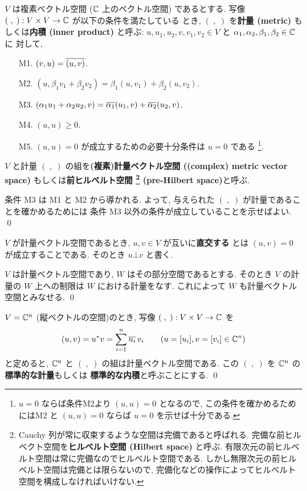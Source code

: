 \documentclass[12pt,twoside]{jarticle}
\begin{document}
$V$ は複素ベクトル空間 (${\mathbb C}$ 上のベクトル空間) であるとする.
写像 $(\;,\;):V\times V\to{\mathbb C}$ が以下の条件を満たしている
とき, $(\;,\;)$ を{\bf 計量 (metric)} もしくは{\bf 内積 (inner product)} 
と呼ぶ:
$u,u_1,u_2,v,v_1,v_2\in V$ と $\alpha_1,\alpha_2,\beta_1,\beta_2\in{\mathbb C}$ に
対して, 
\begin{itemize}
\item[M1.] $(v, u) = \overline{(u, v)}$.
\item[M2.] $(u, \beta_1 v_1+\beta_2 v_2)
  = \beta_1(u, v_1) + \beta_2(u, v_2)$.
\item[M3.] $(\alpha_1 u_1 + \alpha_2 u_2, v)
  = \overline{\alpha_1}(u_1, v) + \overline{\alpha_2}(u_2, v)$.
\item[M4.] $(u, u)\ge 0$.
\item[M5.] $(u,u)=0$ が成立するための必要十分条件は $u=0$ である%
  \footnote{$u=0$ ならば条件M2より $(u,u)=0$ となるので,
    この条件を確かめるためにはM2
    と $(u,u)=0$ ならば $u=0$ を示せば十分である.}.
\end{itemize}
$V$ と計量 $(\;,\;)$ の組を{\bf (複素)計量ベクトル空間 
((complex) metric vector space)} もしくは{\bf 前ヒルベルト空間%
\footnote{Cauchy 列が常に収束するような空間は完備であると呼ばれる.
  完備な前ヒルベクト空間を{\bf ヒルベルト空間 (Hilbert space)} と呼ぶ.
  有限次元の前ヒルベルト空間は常に完備なのでヒルベルト空間である.
  しかし無限次元の前ヒルベルト空間は完備とは限らないので,
  完備化などの操作によってヒルベルト空間を構成しなければいけない.}
(pre-Hilbert space)}と呼ぶ.

\begin{rem}
  条件 M3 は M1 と M2 から導かれる. 
  よって, 与えられた $(\;,\;)$ が計量であることを確かめるためには
  条件 M3 以外の条件が成立していることを示せばよい. \qed
\end{rem}

$V$ が計量ベクトル空間であるとき, $u,v\in V$ が互いに{\bf 直交する}
とは $(u,v)=0$ が成立することである.  
そのとき $u\bot v$ と書く.


\begin{question}[部分空間]
  $V$ は計量ベクトル空間であり, $W$ はその部分空間であるとする.
  そのとき $V$ の計量の $W$ 上への制限は $W$ における計量をなす.
  これによって $W$ も計量ベクトル空間とみなせる.
  \qed
\end{question}


\begin{question}
  $V={\mathbb C}^n$ (縦ベクトルの空間)のとき, 
  写像 $(\;,\;):V\times V\to{\mathbb C}$ を
  \begin{equation*}
    (u,v) = u^*v = \sum_{i=1}^n \overline{u_i}\,v_i
    \qquad
    (u=[u_i], v=[v_i]\in{\mathbb C}^n)
  \end{equation*}
  と定めると, ${\mathbb C}^n$ と $(\;,\;)$ の組は計量ベクトル空間である. 
  この $(\;,\;)$ を ${\mathbb C}^n$ の{\bf 標準的な計量}もしくは
  {\bf 標準的な内積}と呼ぶことにする.
  \qed
\end{question}
\end{document}
